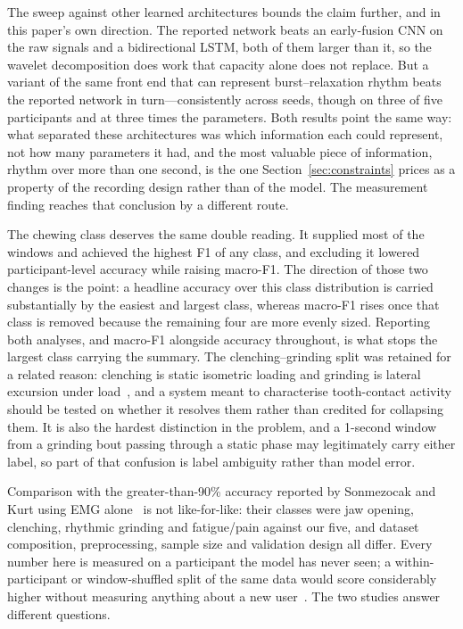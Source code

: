 \documentclass[pdflatex,sn-nature,iicol]{sn-jnl}
\begin{document}
The sweep against other learned architectures bounds the claim further, and in this paper's own direction. The reported network beats an early-fusion CNN on the raw signals and a bidirectional LSTM, both of them larger than it, so the wavelet decomposition does work that capacity alone does not replace. But a variant of the same front end that can represent burst--relaxation rhythm beats the reported network in turn---consistently across seeds, though on three of five participants and at three times the parameters. Both results point the same way: what separated these architectures was which information each could represent, not how many parameters it had, and the most valuable piece of information, rhythm over more than one second, is the one Section~\ref{sec:constraints} prices as a property of the recording design rather than of the model. The measurement finding reaches that conclusion by a different route.

The chewing class deserves the same double reading. It supplied most of the windows and achieved the highest F1 of any class, and excluding it lowered participant-level accuracy while raising macro-F1. The direction of those two changes is the point: a headline accuracy over this class distribution is carried substantially by the easiest and largest class, whereas macro-F1 rises once that class is removed because the remaining four are more evenly sized. Reporting both analyses, and macro-F1 alongside accuracy throughout, is what stops the largest class carrying the summary. The clenching--grinding split was retained for a related reason: clenching is static isometric loading and grinding is lateral excursion under load~\cite{lan2022comparative}, and a system meant to characterise tooth-contact activity should be tested on whether it resolves them rather than credited for collapsing them. It is also the hardest distinction in the problem, and a 1-second window from a grinding bout passing through a static phase may legitimately carry either label, so part of that confusion is label ambiguity rather than model error.

Comparison with the greater-than-90\% accuracy reported by Sonmezocak and Kurt using EMG alone~\cite{sonmezocak2021detection} is not like-for-like: their classes were jaw opening, clenching, rhythmic grinding and fatigue/pain against our five, and dataset composition, preprocessing, sample size and validation design all differ. Every number here is measured on a participant the model has never seen; a within-participant or window-shuffled split of the same data would score considerably higher without measuring anything about a new user~\cite{saeb2017need,little2017using}. The two studies answer different questions.
\end{document}
